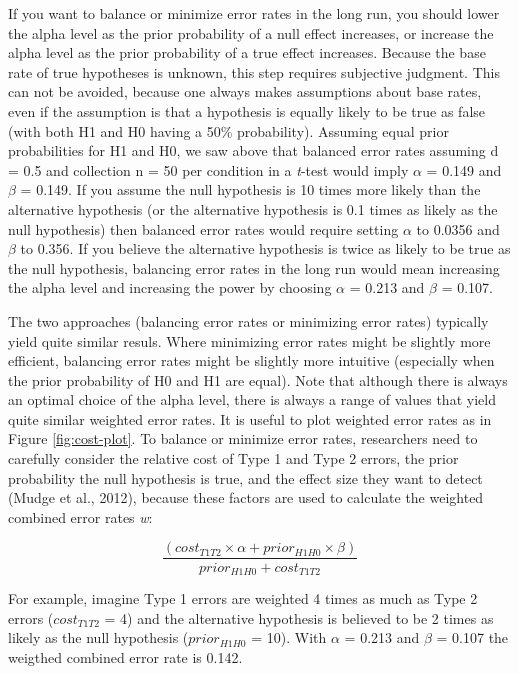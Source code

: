 \documentclass[
  english,
  ,jou,floatsintext]{apa6}
\begin{document}
If you want to balance or minimize error rates in the long run, you should lower the alpha level as the prior probability of a null effect increases, or increase the alpha level as the prior probability of a true effect increases. Because the base rate of true hypotheses is unknown, this step requires subjective judgment. This can not be avoided, because one always makes assumptions about base rates, even if the assumption is that a hypothesis is equally likely to be true as false (with both H1 and H0 having a 50\% probability). Assuming equal prior probabilities for H1 and H0, we saw above that balanced error rates assuming d = 0.5 and collection n = 50 per condition in a \emph{t}-test would imply \(\alpha\) = 0.149 and \(\beta\) = 0.149. If you assume the null hypothesis is 10 times more likely than the alternative hypothesis (or the alternative hypothesis is 0.1 times as likely as the null hypothesis) then balanced error rates would require setting \(\alpha\) to 0.0356 and \(\beta\) to 0.356. If you believe the alternative hypothesis is twice as likely to be true as the null hypothesis, balancing error rates in the long run would mean increasing the alpha level and increasing the power by choosing \(\alpha\) = 0.213 and \(\beta\) = 0.107.

The two approaches (balancing error rates or minimizing error rates) typically yield quite similar resuls. Where minimizing error rates might be slightly more efficient, balancing error rates might be slightly more intuitive (especially when the prior probability of H0 and H1 are equal). Note that although there is always an optimal choice of the alpha level, there is always a range of values that yield quite similar weighted error rates. It is useful to plot weighted error rates as in Figure \ref{fig:cost-plot}. To balance or minimize error rates, researchers need to carefully consider the relative cost of Type 1 and Type 2 errors, the prior probability the null hypothesis is true, and the effect size they want to detect (Mudge et al., 2012), because these factors are used to calculate the weighted combined error rates \emph{w}:

\begin{equation}
\frac{(cost_{T1T2} \times \alpha + prior_{H1H0} \times \beta)}{prior_{H1H0}+cost_{T1T2}}
\label{eq:minimize}
\end{equation}

For example, imagine Type 1 errors are weighted 4 times as much as Type 2 errors (\(cost_{T1T2}\) = 4) and the alternative hypothesis is believed to be 2 times as likely as the null hypothesis (\(prior_{H1H0}\) = 10). With \(\alpha\) = 0.213 and \(\beta\) = 0.107 the weigthed combined error rate is 0.142.
\end{document}
